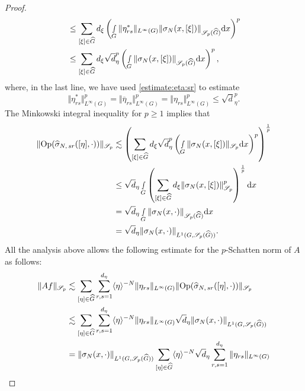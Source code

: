 \documentclass[12pt, reqno]{amsart}
\theoremstyle{definition}
\theoremstyle{remark}
\numberwithin{equation}{section}
\begin{document}
\begin{proof}
\begin{align*}
  &\leq  \sum_{[\xi]\in \widehat{G}}d_\xi \left(\smallint\limits_{G}\Vert\eta_{rs}^{*}\Vert_{L^{\infty}(G)}  \Vert {\sigma}_{N}(x,[\xi])\Vert_{\mathscr{S}_p(\widehat{G})}\textnormal{d}x\right)^{p}\\
  &\leq  \sum_{[\xi]\in \widehat{G}}d_\xi\sqrt{d}_{\eta}^{p}\left( \smallint\limits_{G}  \Vert {\sigma}_{N}(x,[\xi])\Vert_{\mathscr{S}_p(\widehat{G})}\textnormal{d}x\right)^p,
\end{align*}
where, in the last line, we have used \eqref{estimate:eta:sr} to estimate
\begin{equation*}
  \Vert\eta_{rs}^{*}\Vert_{L^{\infty}(G)}^p=\Vert\overline{\eta}_{rs}\Vert_{L^{\infty}(G)}^p  =\Vert\eta_{rs}\Vert_{L^{\infty}(G)}^p  \leq \sqrt{d}_\eta^p.
\end{equation*}
The Minkowski integral inequality for $p\geq 1$ implies that
\begin{align*}
\Vert\textnormal{Op}(\widehat{\sigma}_{N,\,sr }([\eta],\cdot ))\Vert_{\mathscr{S}_p} &\lesssim\left( \sum_{[\xi]\in \widehat{G}}d_\xi\sqrt{d}_{\eta}^{p}\left( \smallint\limits_{G}  \Vert {\sigma}_{N }(x,[\xi])\Vert_{\mathscr{S}_p}\textnormal{d}x\right)^p  \right)^{\frac{1}{p}} \\
&\leq \sqrt{d}_\eta \smallint\limits_G\left(\sum_{[\xi]\in \widehat{G}}d_\xi \Vert {\sigma}_{N }(x,[\xi])\Vert_{\mathscr{S}_p}^p \right)^{\frac{1}{p}}\textnormal{d}x\\
&= \sqrt{d}_\eta \smallint\limits_G\Vert {\sigma}_{N }(x,\cdot)\Vert_{\mathscr{S}_p(\widehat{G})} \textnormal{d}x\\
&= \sqrt{d}_\eta \Vert {\sigma}_{N }(x,\cdot)\Vert_{L^1(G,\mathscr{S}_p(\widehat{G}))}.
\end{align*}
All the analysis above allows the following estimate  for the $p$-Schatten norm of $A$ as follows:
\begin{align*}
  \Vert Af \Vert_{\mathscr{S}_p} &\lesssim \sum_{[\eta]\in \widehat{G}}\sum_{r,s=1}^{d_\eta}\langle \eta\rangle^{-N}\Vert \eta_{rs}\Vert_{L^\infty(G)}\Vert\textnormal{Op}(\widehat{\sigma}_{N,\,sr }([\eta],\cdot ))\Vert_{\mathscr{S}_p}  \\
  &\lesssim \sum_{[\eta]\in \widehat{G}}\sum_{r,s=1}^{d_\eta}\langle \eta\rangle^{-N}\Vert \eta_{rs}\Vert_{L^\infty(G)}\sqrt{d}_\eta \Vert {\sigma}_{N }(x,\cdot)\Vert_{L^1(G,\mathscr{S}_p(\widehat{G}))}  \\
  &= \Vert {\sigma}_{N }(x,\cdot)\Vert_{L^1(G,\mathscr{S}_p(\widehat{G}))}  \sum_{[\eta]\in \widehat{G}}\langle \eta\rangle^{-N}\sqrt{d}_\eta \sum_{r,s=1}^{d_\eta}\Vert \eta_{rs}\Vert_{L^\infty(G)}  \\

\end{align*}
\end{proof}
\end{document}
